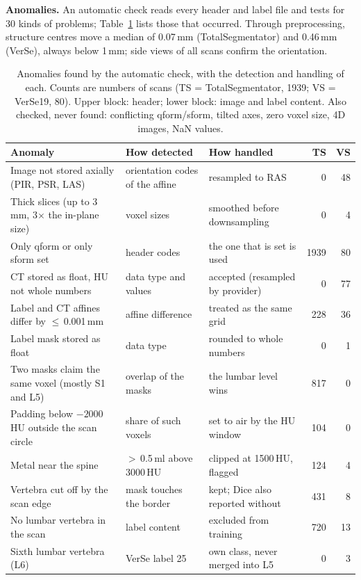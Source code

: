 \documentclass[10pt,a4paper]{article}
\begin{document}
\textbf{Anomalies.} An automatic check reads every header and label file and tests for 30 kinds of problems; Table~\ref{tab:anom} lists those that occurred. Through preprocessing, structure centres move a median of 0.07\,mm (TotalSegmentator) and 0.46\,mm (VerSe), always below 1\,mm; side views of all scans confirm the orientation.

\begin{table}[h]
\centering\footnotesize
\caption{Anomalies found by the automatic check, with the detection and handling of each. Counts are numbers of scans (TS = TotalSegmentator, 1939; VS = VerSe19, 80). Upper block: header; lower block: image and label content. Also checked, never found: conflicting qform/sform, tilted axes, zero voxel size, 4D images, NaN values.}
\label{tab:anom}
\begin{tabularx}{\linewidth}{@{}l>{\raggedright\arraybackslash}X>{\raggedright\arraybackslash}Xrr@{}}
\toprule
Anomaly & How detected & How handled & TS & VS\\
\midrule
Image not stored axially (PIR, PSR, LAS) & orientation codes of the affine & resampled to RAS & 0 & 48\\
Thick slices (up to 3\,mm, 3$\times$ the in-plane size) & voxel sizes & smoothed before downsampling & 0 & 4\\
Only qform or only sform set & header codes & the one that is set is used & 1939 & 80\\
CT stored as float, HU not whole numbers & data type and values & accepted (resampled by provider) & 0 & 77\\
Label and CT affines differ by $\le$\,0.001\,mm & affine difference & treated as the same grid & 228 & 36\\
Label mask stored as float & data type & rounded to whole numbers & 0 & 1\\
\midrule
Two masks claim the same voxel (mostly S1 and L5) & overlap of the masks & the lumbar level wins & 817 & 0\\
Padding below $-2000$\,HU outside the scan circle & share of such voxels & set to air by the HU window & 104 & 0\\
Metal near the spine & $>$\,0.5\,ml above 3000\,HU & clipped at 1500\,HU, flagged & 124 & 4\\
Vertebra cut off by the scan edge & mask touches the border & kept; Dice also reported without & 431 & 8\\
No lumbar vertebra in the scan & label content & excluded from training & 720 & 13\\
Sixth lumbar vertebra (L6) & VerSe label 25 & own class, never merged into L5 & 0 & 3\\
\bottomrule
\end{tabularx}
\end{table}
\end{document}
